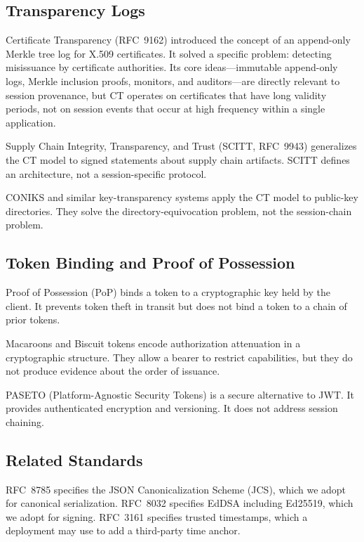 \documentclass[11pt,a4paper]{article}
\begin{document}
\subsection{Transparency Logs}

Certificate Transparency (RFC~9162) introduced the concept of an append-only Merkle tree log for X.509 certificates. It solved a specific problem: detecting misissuance by certificate authorities. Its core ideas---immutable append-only logs, Merkle inclusion proofs, monitors, and auditors---are directly relevant to session provenance, but CT operates on certificates that have long validity periods, not on session events that occur at high frequency within a single application.

Supply Chain Integrity, Transparency, and Trust (SCITT, RFC~9943) generalizes the CT model to signed statements about supply chain artifacts. SCITT defines an architecture, not a session-specific protocol.

CONIKS and similar key-transparency systems apply the CT model to public-key directories. They solve the directory-equivocation problem, not the session-chain problem.

\subsection{Token Binding and Proof of Possession}

Proof of Possession (PoP) binds a token to a cryptographic key held by the client. It prevents token theft in transit but does not bind a token to a chain of prior tokens.

Macaroons and Biscuit tokens encode authorization attenuation in a cryptographic structure. They allow a bearer to restrict capabilities, but they do not produce evidence about the order of issuance.

PASETO (Platform-Agnostic Security Tokens) is a secure alternative to JWT. It provides authenticated encryption and versioning. It does not address session chaining.

\subsection{Related Standards}

RFC~8785 specifies the JSON Canonicalization Scheme (JCS), which we adopt for canonical serialization. RFC~8032 specifies EdDSA including Ed25519, which we adopt for signing. RFC~3161 specifies trusted timestamps, which a deployment may use to add a third-party time anchor.
\end{document}
